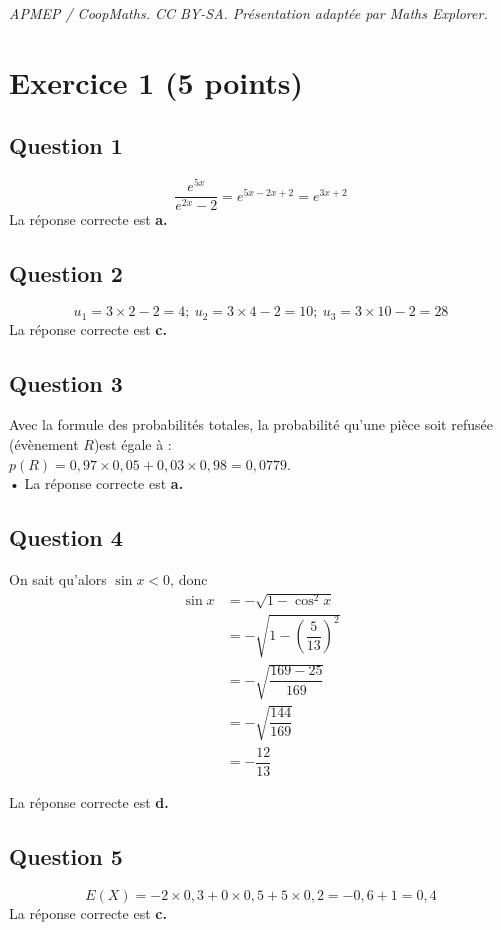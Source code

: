 \documentclass[10pt]{article}
\begin{document}
\noindent\textit{APMEP / CoopMaths. CC BY-SA. Présentation adaptée par Maths Explorer.}\par\medskip
\section*{Exercice 1 (5 points)}
	

	\subsection*{Question 1}

	
	\[
	\dfrac{e^{5x}}{e^{2x}-2} = e^{5x-2x+2} = e^{3x+2}
	\]
La réponse correcte est \textbf{a.}
	
	\subsection*{Question 2}
	

	
	\[
	u_1 = 3 \times 2 - 2 = 4 ; \ u_2 = 3 \times 4 - 2 = 10 ; \ u_3 = 3 \times 10 - 2 = 28
	\]
La réponse correcte est \textbf{c.}
	
	\subsection*{Question 3}
	
Avec la formule des probabilités totales, la probabilité qu’une pièce soit refusée (évènement $R$)est égale à :\\
 $p(R)=0,97 \times 0,05 + 0,03 \times 0,98 = 0,0779$.\\•
 La réponse correcte est \textbf{a.}
	
	\subsection*{Question 4}
	
On sait qu’alors $\sin x < 0$, donc 
\begin{align*}
	\sin x &= -\sqrt{1 - \cos^2 x}\\
	& = -\sqrt{1 - \left(\dfrac{5}{13}\right)^2}\\
	& = -\sqrt{\dfrac{169 - 25}{169}}\\
	& = -\sqrt{\dfrac{144}{169}}\\
	& = -\dfrac{12}{13}
\end{align*}
	
	La réponse correcte est \textbf{d.}
	
	\subsection*{Question 5}
	
\[
	E(X) = -2 \times 0,3 + 0 \times 0,5 + 5 \times 0,2 = -0,6 + 1 = 0,4
	\]
La réponse correcte est \textbf{c.}
\end{document}
